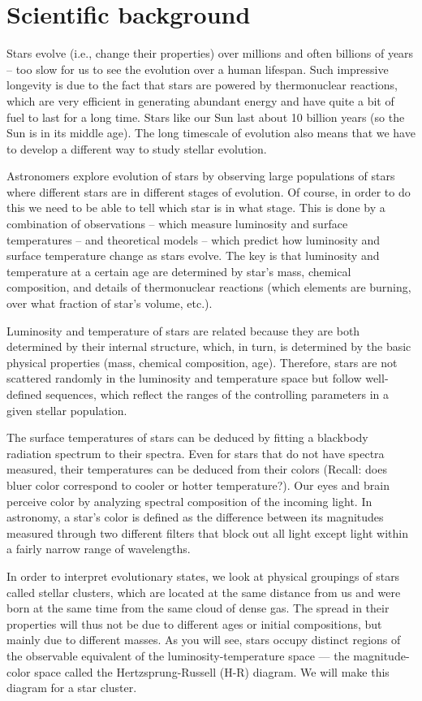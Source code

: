 \section{Scientific background}

Stars evolve (i.e., change their properties) over millions and often billions of years – too slow for us to see the evolution over a human lifespan.  Such impressive longevity is due to the fact that stars are powered by thermonuclear reactions, which are very efficient in generating abundant energy and have quite a bit of fuel to last for a long time. Stars like our Sun last about 10 billion years (so the Sun is in its middle age). The long timescale of evolution also means that we have to develop a different way to study stellar evolution. 

Astronomers explore evolution of stars by observing large populations of stars where different stars are in different stages of evolution. Of course, in order to do this we need to be able to tell which star is in what stage. This is done by a combination of observations – which measure luminosity and surface temperatures – and theoretical models – which predict how luminosity and surface temperature change as stars evolve. The key is that luminosity and temperature at a certain age are determined by star's mass, chemical composition, and details of thermonuclear reactions (which elements are burning, over what fraction of star's volume, etc.).

Luminosity and temperature of stars are related because they are both determined by their internal structure, which, in turn, is determined by the basic physical properties (mass, chemical composition, age). Therefore, stars are not scattered randomly in the luminosity and temperature space but follow well-defined sequences, which reflect the ranges of the controlling parameters in a given stellar population. 

The surface temperatures of stars can be deduced by fitting a blackbody radiation spectrum to their spectra. Even for stars that do not have spectra measured, their temperatures can be deduced from their colors (Recall: does bluer color correspond to cooler or hotter temperature?). Our eyes and brain perceive color by analyzing spectral composition of the incoming light. In astronomy, a star's color is defined as the difference between its magnitudes measured through two different filters that block out all light except light within a fairly narrow range of wavelengths. 

In order to interpret evolutionary states, we look at physical groupings of stars called stellar clusters, which are located at the same distance from us and were born at the same time from the same cloud of dense gas. The spread in their properties will thus not be due to different ages or initial compositions, but mainly due to different masses. As you will see, stars occupy distinct regions of the observable equivalent of the luminosity-temperature space --- the magnitude-color space called the Hertzsprung-Russell (H-R) diagram. We will make this diagram for a star cluster.

